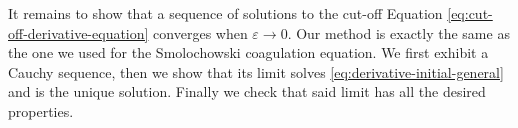 \documentclass[11pt,a4paper]{article}
\newcommand{\RR}{\mathbb{R}}
\newcommand{\RRP}{\mathbb{R}^+_*}
\newcommand{\MC}{\mathcal{M}}
\newcommand{\brac}[1]{\left\langle#1\right\rangle}
\newtheorem{remark}[theorem]{Remark}
\begin{document}

It remains to show that a sequence of solutions to the cut-off Equation \eqref{eq:cut-off-derivative-equation} converges when $\varepsilon \to 0$. Our method is exactly the same as the one we used for the Smolochowski coagulation equation. We first exhibit a Cauchy sequence, then we show that its limit solves \eqref{eq:derivative-initial-general} and is the unique solution. Finally we check that said limit has all the desired properties. 
\end{document}

